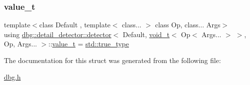 \subsubsection{\texorpdfstring{value\+\_\+t}{value\_t}}
{\footnotesize\ttfamily template$<$class Default , template$<$ class... $>$ class Op, class... Args$>$ \\
using \hyperlink{structdbg_1_1detail__detector_1_1detector}{dbg\+::detail\+\_\+detector\+::detector}$<$ Default, \hyperlink{namespacedbg_1_1detail__detector_a1dbadccf461338e71c55ea392d4ed47c}{void\+\_\+t}$<$ Op$<$ Args... $>$ $>$, Op, Args... $>$\+::\hyperlink{structdbg_1_1detail__detector_1_1detector_3_01Default_00_01void__t_3_01Op_3_01Args_8_8_8_01_4_01_4_00_01Op_00_01Args_8_8_8_01_4_ab9dc20c0565be267d2d98b0e0f4a565b}{value\+\_\+t} =  \hyperlink{namespacestd_a6a860513044e23d34e553ea986e83fa1}{std\+::true\+\_\+type}}



The documentation for this struct was generated from the following file\+:\begin{DoxyCompactItemize}
\item 
\hyperlink{dbg_8h}{dbg.\+h}\end{DoxyCompactItemize}
